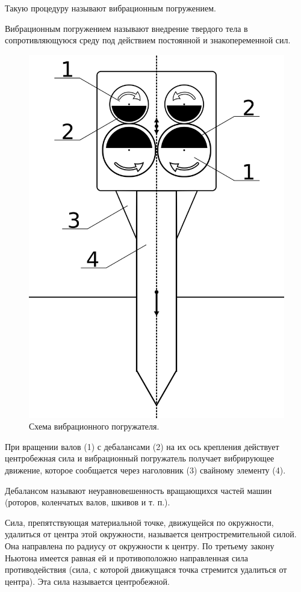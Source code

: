 Такую процедуру называют вибрационным погружением.

\begin{definition}
    Вибрационным погружением называют внедрение твердого тела в сопротивляющуюся среду под действием постоянной и знакопеременной сил.
\end{definition}

\begin{figure}[h]
    \centering
    \includegraphics[width=0.5\linewidth]{img/scheme_porg_2.png}
    \caption{Схема вибрационного погружателя.}
    \label{fig:scheme_porg}
\end{figure}

При вращении валов (1) с дебалансами (2) на их ось крепления действует центробежная сила и вибрационный погружатель получает вибрирующее движение,
которое сообщается через наголовник (3) свайному элементу (4).

\begin{definition}
    Дебалансом называют неуравновешенность вращающихся частей машин (роторов, коленчатых валов, шкивов и т. п.).
\end{definition}

\begin{definition}
    Сила, препятствующая материальной точке, движущейся по окружности, удалиться от центра этой окружности,
    называется центростремительной силой. Она направлена по радиусу от окружности к центру.
    По третьему закону Ньютона имеется равная ей и противоположно направленная сила противодействия
    (сила, с которой движущаяся точка стремится удалиться от центра). Эта сила называется центробежной.
\end{definition}

